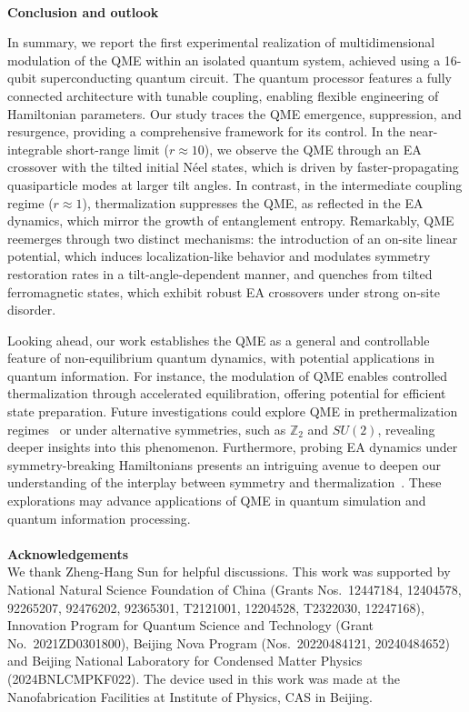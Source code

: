 \documentclass[reprint,superscriptaddress,preprintnumbers,longbibliography,
amsmath,amssymb,aps,floatfix,pra,twocolumn, tightenlines %
]{revtex4-2}
\begin{document}
    ~\\
	\textbf{Conclusion and outlook}
	
	In summary, we report the first experimental realization of multidimensional modulation of the QME within an isolated quantum system, achieved using a 16-qubit superconducting quantum circuit. The quantum processor features a fully connected architecture with tunable coupling, enabling flexible engineering of Hamiltonian parameters. Our study traces the QME emergence, suppression, and resurgence, providing a comprehensive framework for its control. In the near-integrable short-range limit (\( r \approx 10 \)), we observe the QME through an EA crossover with the tilted initial Néel states, which is driven by faster-propagating quasiparticle modes at larger tilt angles. In contrast, in the intermediate coupling regime (\( r \approx 1 \)), thermalization suppresses the QME, as reflected in the EA dynamics, which mirror the growth of entanglement entropy. Remarkably, QME reemerges through two distinct mechanisms: the introduction of an on-site linear potential, which induces localization-like behavior and modulates symmetry restoration rates in a tilt-angle-dependent manner, and quenches from tilted ferromagnetic states, which exhibit robust EA crossovers under strong on-site disorder.
    
    Looking ahead, our work establishes the QME as a general and controllable feature of non-equilibrium quantum dynamics, with potential applications in quantum  information. For instance, the modulation of QME enables controlled thermalization through accelerated equilibration, offering potential for efficient state preparation. Future investigations could explore QME in prethermalization regimes~\cite{2025_periodicallydrivenEA,prether_IME_arxiv} or under alternative symmetries, such as \( \mathbb{Z}_2 \) and \( SU(2) \), revealing deeper insights into this phenomenon. Furthermore, probing EA dynamics under symmetry-breaking Hamiltonians presents an intriguing avenue to deepen our understanding of the interplay between symmetry and thermalization~\cite{2025_QME_no_sym,Breaking_Hamitonion_zhang}. These explorations may advance applications of QME in quantum simulation and quantum information processing.
    \\
	

	
	
	
	~\\
	\noindent
	\textbf{Acknowledgements}\\
	We thank Zheng-Hang Sun for helpful discussions. This work was supported by National Natural Science Foundation of China (Grants Nos.~12447184, 12404578, 92265207, 92476202, 92365301, T2121001, 12204528, T2322030, 12247168), Innovation Program for Quantum Science and Technology (Grant No.~2021ZD0301800), Beijing Nova Program (Nos.~20220484121, 20240484652) and Beijing National Laboratory for Condensed Matter Physics (2024BNLCMPKF022). The device used in this work was made at the Nanofabrication Facilities at Institute of Physics, CAS in Beijing.
	
\end{document}

